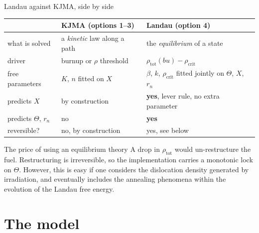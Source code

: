 \documentclass[10pt,aspectratio=169]{beamer}
\newcommand{\good}[1]{\textcolor{good}{\textbf{#1}}}
\begin{document}
\begin{frame}{Landau against KJMA, side by side}
  \begin{center}
  \small
  \begin{tabular}{p{}p{}p{}}
    \toprule
     & KJMA (options 1--3) & Landau (option 4) \\
    \midrule
    what is solved      & a \emph{kinetic} law along a path & the \emph{equilibrium} of a state \\
    driver              & burnup or $\rho$ threshold      & $\rho_{\text{tot}}(bu)-\rho_{\text{crit}}$ \\
    free parameters     & $K$, $n$ fitted on $X$             & $\beta$, $k$, $\rho_{\text{crit}}$ fitted jointly on $\Theta$, $X$, $r_n$ \\
    predicts $X$        & by construction                    & \good{yes}, lever rule, no extra parameter \\
    predicts $\Theta$, $r_n$ & no                            & \good{yes} \\
    reversible?         & no, by construction                & yes, see below \\
    \bottomrule
  \end{tabular}
  \end{center}

  \begin{block}{The price of using an equilibrium theory}
    A drop in $\rho_{\text{tot}}$ would un-restructure
    the fuel. Restructuring is irreversible, so the implementation carries a \alert{monotonic lock} on $\Theta$. However, this is easy if one considers the dislocation density generated by irradiation, and
    eventually includes the annealing phenomena within the evolution of the Landau free energy.
  \end{block}
\end{frame}


\section{The model}
\end{document}
